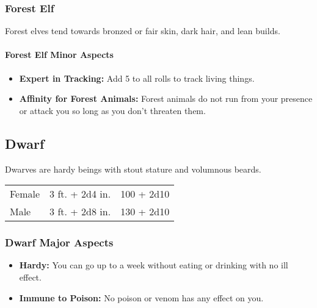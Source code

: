 \begin{multicols}{2}
\subsubsection{Forest Elf}

Forest elves tend towards bronzed or fair skin, dark hair, and lean builds.

\paragraph{Forest Elf Minor Aspects}

\begin{itemize}
    \item \textbf{Expert in Tracking:} Add 5 to all rolls to track living things.
    \item \textbf{Affinity for Forest Animals:} Forest animals do not run from your presence or attack you so long as you don't threaten them.
\end{itemize}

\subsection{Dwarf}

Dwarves are hardy beings with stout stature and volumnous beards.

\begin{center}
{
\begin{xtabular}{|l|l|l|}
Female & 3 ft. + 2d4 in. & 100 + 2d10 \\
Male & 3 ft. + 2d8 in. & 130 + 2d10 \\
\hline
\end{xtabular}
}
\end{center}

\subsubsection{Dwarf Major Aspects}

\begin{itemize}
    \item \textbf{Hardy:} You can go up to a week without eating or drinking with no ill effect.
    \item \textbf{Immune to Poison:} No poison or venom has any effect on you.
\end{itemize}


\end{multicols}
